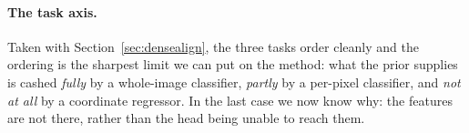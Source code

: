 \paragraph{The task axis.} Taken with Section~\ref{sec:densealign}, the three
tasks order cleanly and the ordering is the sharpest limit we can put on the
method: what the prior supplies is cashed \emph{fully} by a whole-image
classifier, \emph{partly} by a per-pixel classifier, and \emph{not at all} by a
coordinate regressor. In the last case we now know why: the features are not
there, rather than the head being unable to reach them.
